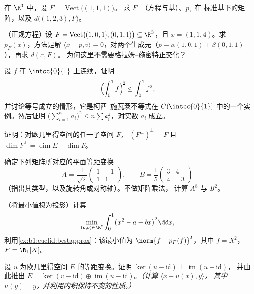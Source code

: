 \begin{exercise}[$\star$]\label{exo:b1:euclid:4}
在 $\R^3$ 中，设 $F = \operatorname{Vect}\bigl((1,1,1)\bigr)$。
求 $F^\perp$（方程与基）、$p_F$ 在
标准基下的矩阵，以及 $d\bigl((1, 2, 3), F\bigr)$。
\end{exercise}

\begin{exercise}[$\star\star$]\label{exo:b1:euclid:5}
（正规方程）设 $F =
\operatorname{Vect}\bigl((1,0,1),(0,1,1)\bigr) \subseteq \R^3$，且
$x = (1, 1, 4)$。求 $p_F(x)$，方法是解 $\langle x - p, v
\rangle = 0$，对两个生成元（$p = \alpha(1,0,1) +
\beta(0,1,1)$），再求 $d(x, F)$。
为何这里不需要格拉姆–施密特正交化？
\end{exercise}

\begin{exercise}[$\star\star$]\label{exo:b1:euclid:6}
设 $f$ 在 $\intcc{0}{1}$ 上连续，证明
\[
\Bigl(\int_0^1 f\Bigr)^{\!2} \leq \int_0^1 f^2 ,
\]
并讨论等号成立的情形，它是柯西–施瓦茨不等式在
$C(\intcc{0}{1})$ 中的一个实例。然后证明 $\bigl(\sum_{i=1}^n a_i\bigr)^2 \leq
n \sum a_i^2$，对实数 $a_i$ 成立。
\end{exercise}

\begin{exercise}[$\star\star$]\label{exo:b1:euclid:7}
证明：对欧几里得空间的任一子空间 $F$，
$(F^{\perp})^{\perp} = F$ 且 $\dim F^{\perp} = \dim E - \dim F$。
\end{exercise}

\begin{exercise}[$\star\star$]\label{exo:b1:euclid:8}
确定下列矩阵所对应的平面等距变换
\[
A = \frac{1}{\sqrt 2}\begin{pmatrix} 1 & -1\\ 1 & 1\end{pmatrix},
\qquad
B = \frac{1}{5}\begin{pmatrix} 3 & 4\\ 4 & -3\end{pmatrix}
\]
（指出其类型，以及旋转角或对称轴）。不做矩阵乘法，
计算 $A^8$ 与 $B^2$。
\end{exercise}

\begin{exercise}[$\star\star\star$]\label{exo:b1:euclid:9}
（将最小值视为投影）计算
\[
\min_{(a, b) \in \R^2} \int_0^1 \bigl(x^2 - a - bx\bigr)^2 \dd x ,
\]
利用\cref{ex:b1:euclid:bestapprox}：该最小值为 $\norm{f -
p_F(f)}^2$，其中 $f = X^2$，$F = \R_1[X]$。
\end{exercise}

\begin{exercise}[$\star\star\star$]\label{exo:b1:euclid:10}
设 $u$ 为欧几里得空间 $E$ 的等距变换。证明
$\ker(u - \mathrm{id}) \perp \operatorname{im}(u - \mathrm{id})$，
并由此推出 $E = \ker(u - \mathrm{id}) \oplus \operatorname{im}(u -
\mathrm{id})$。\emph{（计算 $\langle x - u(x), y\rangle$，
其中 $u(y) = y$，并利用内积保持不变的性质。）}
\end{exercise}


